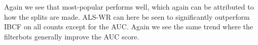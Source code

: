 Again we see that most-popular performs well, which again can be attributed to how the splits are made. ALS-WR can here be seen to significantly outperform
IBCF on all counts except for the AUC. Again we see the same trend where the filterbots generally improve the AUC score.


\begin{table}[H]
\centering
{}
\end{table}
